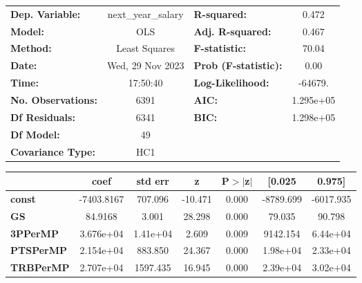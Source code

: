 \begin{center}
\begin{tabular}{lclc}
\toprule
\textbf{Dep. Variable:}       & next\_year\_salary & \textbf{  R-squared:         } &     0.472   \\
\textbf{Model:}               &        OLS         & \textbf{  Adj. R-squared:    } &     0.467   \\
\textbf{Method:}              &   Least Squares    & \textbf{  F-statistic:       } &     70.04   \\
\textbf{Date:}                &  Wed, 29 Nov 2023  & \textbf{  Prob (F-statistic):} &     0.00    \\
\textbf{Time:}                &      17:50:40      & \textbf{  Log-Likelihood:    } &   -64679.   \\
\textbf{No. Observations:}    &         6391       & \textbf{  AIC:               } & 1.295e+05   \\
\textbf{Df Residuals:}        &         6341       & \textbf{  BIC:               } & 1.298e+05   \\
\textbf{Df Model:}            &           49       & \textbf{                     } &             \\
\textbf{Covariance Type:}     &        HC1         & \textbf{                     } &             \\
\bottomrule
\end{tabular}
\begin{tabular}{lcccccc}
                              & \textbf{coef} & \textbf{std err} & \textbf{z} & \textbf{P$> |$z$|$} & \textbf{[0.025} & \textbf{0.975]}  \\
\midrule
\textbf{const}                &   -7403.8167  &      707.096     &   -10.471  &         0.000        &    -8789.699    &    -6017.935     \\
\textbf{GS}                   &      84.9168  &        3.001     &    28.298  &         0.000        &       79.035    &       90.798     \\
\textbf{3PPerMP}              &    3.676e+04  &     1.41e+04     &     2.609  &         0.009        &     9142.154    &     6.44e+04     \\
\textbf{PTSPerMP}             &    2.154e+04  &      883.850     &    24.367  &         0.000        &     1.98e+04    &     2.33e+04     \\
\textbf{TRBPerMP}             &    2.707e+04  &     1597.435     &    16.945  &         0.000        &     2.39e+04    &     3.02e+04     \\

\end{tabular}
\end{center}
